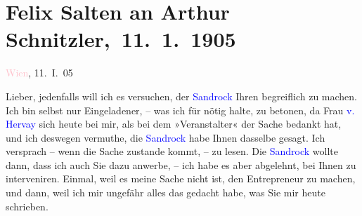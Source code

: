 

\renewcommand{\erwaehntePersonen}{Personen: Elvira Leontine Hervay von Kirchberg, Adele Sandrock}
\renewcommand{\erwaehnteOrte}{Orte: Wien}
\renewcommand{\erwaehnteWerke}{}
\section[ Felix Salten an Arthur Schnitzler, 11. 1. 1905]{Felix Salten an Arthur Schnitzler, 11. 1. 1905}
\nopagebreak{}
\rehead{ }\normalsize\beginnumbering{}
\toendnotes[C]{\smallbreak\pagebreak[2]}
\toendnotes[C]{\smallbreak}
\pstart
           \raggedleft{}{\pb}\textcolor{pink}{Wien}{}\ledrightnote{\textcolor{pink}{Wien}}, 11. I. 05\pend
           
\pstart
           Lieber, jedenfalls will ich es versuchen, der \textcolor{blue}{Sandrock}{}\ledrightnote{\textcolor{blue}{Adele Sandrock}} Ihren \label{K_L03405-1v}\label{K_L03405-1h} begreiflich zu machen. Ich bin selbst nur Eingeladener, – was ich für nötig
               halte, zu betonen, da Frau \textcolor{blue}{v. Hervay}{}\ledrightnote{\textcolor{blue}{Elvira Leontine Hervay von Kirchberg}} sich heute bei mir, als bei dem »Veranstalter« der Sache
               bedankt hat, und ich deswegen vermuthe, die \textcolor{blue}{Sandrock}{}\ledrightnote{\textcolor{blue}{Adele Sandrock}} habe Ihnen dasselbe gesagt. Ich versprach – wenn die Sache zustande kommt, – zu lesen. Die \textcolor{blue}{Sandrock}{}\ledrightnote{\textcolor{blue}{Adele Sandrock}} wollte
               dann, dass ich auch Sie dazu anwerbe, – ich habe es aber abgelehnt, bei Ihnen zu
               interveniren. Einmal, weil es meine Sache nicht ist, den Entrepreneur zu machen, und
               dann, weil ich mir ungefähr alles das gedacht habe, was Sie mir heute schrieben.\pend
           

